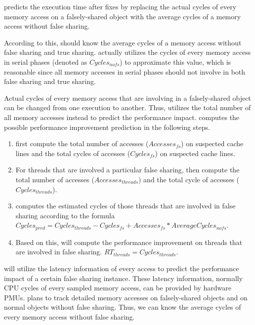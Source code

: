 \cheetah{} predicts the execution time after fixes by replacing the actual cycles of every memory access on a falsely-shared object with the average cycles of a memory access without false sharing. 

According to this, \cheetah{} should know the average cycles of a memory access without false sharing and true sharing. \Cheetah{} actually utilizes the cycles of every memory access in serial phases (denoted as $Cycles_{nofs}$) to approximate this value, which is reasonable since all memory accesses in serial phases should not involve in both false sharing and true sharing. 

Actual cycles of every memory access that are involving in a falsely-shared object can be changed from one execution to another. Thus, \cheetah{} utilizes the total number of all memory accesses instead to predict the performance impact. \Cheetah{} computes the possible performance improvement prediction in the following steps.
 
\begin{enumerate}
\item \cheetah{} first compute the total number of accesses ($Accesses_{fs}$) on suspected cache lines and the total cycles of accesses ($Cycles_{fs}$) on suspected cache lines.

\item For threads that are involved a particular false sharing, \cheetah{} then compute the total number of accesses ($Accesses_{threads}$) and the total cycle of accesses ($Cycles_{threads}$). 

\item \Cheetah{} computes the estimated cycles of those threads that are involved in false sharing according to the formula $Cycles_{pred} = Cycles_{threads} - Cycles_{fs} + Accesses_{fs} * AverageCycles_{nofs}$. 

\item  Based on this, \cheetah{} will compute the performance improvement on threads that are involved in false sharing.
$RT_{threads} = Cycles_{threads}  $. 

\end{enumerate}



\cheetah{} will utilize the latency information of every access to predict the performance impact of a certain false sharing instance. These latency information, normally CPU cycles of every sampled memory access, can be provided by hardware PMUs. \Cheetah{} plans to track detailed memory accesses on falsely-shared objects and on normal objects without false sharing. Thus, we can know the average cycles of every memory access without false sharing. 

